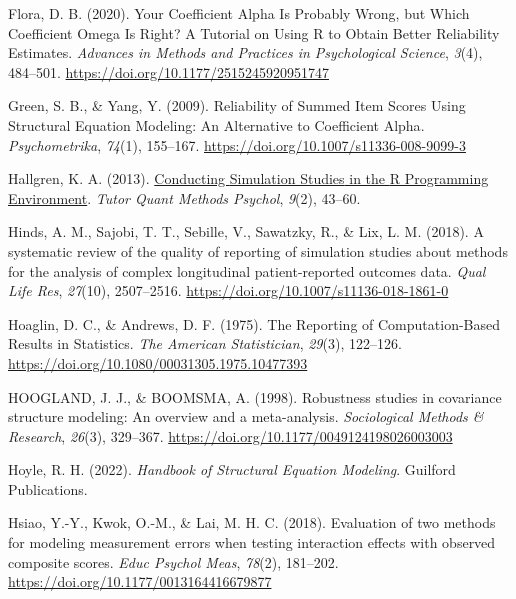 \documentclass[
  man]{apa6}
\newlength{\cslhangindent}
\newlength{\cslentryspacingunit} %
\newenvironment{CSLReferences}[2] %
 {%
  \setlength{\parindent}{0pt}
  \ifodd #1
  \let\oldpar\par
  \def\par{\hangindent=\cslhangindent\oldpar}
  \fi
  \setlength{\parskip}{#2\cslentryspacingunit}
 }%
 {}
\begin{document}
\begin{CSLReferences}{1}{0}
\leavevmode{}%
Flora, D. B. (2020). Your {Coefficient Alpha Is Probably Wrong}, but {Which Coefficient Omega Is Right}? {A Tutorial} on {Using R} to {Obtain Better Reliability Estimates}. \emph{Advances in Methods and Practices in Psychological Science}, \emph{3}(4), 484--501. \url{https://doi.org/10.1177/2515245920951747}

\leavevmode{}%
Green, S. B., \& Yang, Y. (2009). Reliability of {Summed Item Scores Using Structural Equation Modeling}: {An Alternative} to {Coefficient Alpha}. \emph{Psychometrika}, \emph{74}(1), 155--167. \url{https://doi.org/10.1007/s11336-008-9099-3}

\leavevmode{}%
Hallgren, K. A. (2013). \href{https://www.ncbi.nlm.nih.gov/pmc/articles/PMC4110976}{Conducting {Simulation Studies} in the {R Programming Environment}}. \emph{Tutor Quant Methods Psychol}, \emph{9}(2), 43--60.

\leavevmode{}%
Hinds, A. M., Sajobi, T. T., Sebille, V., Sawatzky, R., \& Lix, L. M. (2018). A systematic review of the quality of reporting of simulation studies about methods for the analysis of complex longitudinal patient-reported outcomes data. \emph{Qual Life Res}, \emph{27}(10), 2507--2516. \url{https://doi.org/10.1007/s11136-018-1861-0}

\leavevmode{}%
Hoaglin, D. C., \& Andrews, D. F. (1975). The {Reporting} of {Computation-Based Results} in {Statistics}. \emph{The American Statistician}, \emph{29}(3), 122--126. \url{https://doi.org/10.1080/00031305.1975.10477393}

\leavevmode{}%
HOOGLAND, J. J., \& BOOMSMA, A. (1998). Robustness studies in covariance structure modeling: {An} overview and a meta-analysis. \emph{Sociological Methods \& Research}, \emph{26}(3), 329--367. \url{https://doi.org/10.1177/0049124198026003003}

\leavevmode{}%
Hoyle, R. H. (2022). \emph{Handbook of {Structural Equation Modeling}}. Guilford Publications.

\leavevmode{}%
Hsiao, Y.-Y., Kwok, O.-M., \& Lai, M. H. C. (2018). Evaluation of two methods for modeling measurement errors when testing interaction effects with observed composite scores. \emph{Educ Psychol Meas}, \emph{78}(2), 181--202. \url{https://doi.org/10.1177/0013164416679877}


\end{CSLReferences}
\end{document}
